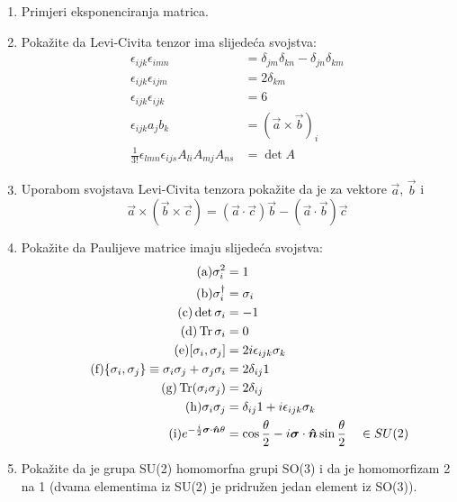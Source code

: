 \begin{enumerate}[{5}.1]

\item Primjeri eksponenciranja matrica.

\item \label{zad:LeviCivitaProperties} Pokažite da Levi-Civita tenzor ima slijedeća svojstva:
\begin{align*}
\tag{a}\epsilon_{ijk}\epsilon_{imn}&=\delta_{jm}\delta_{kn}-\delta_{jn}\delta_{km}\\
\tag{b}\epsilon_{ijk}\epsilon_{ijm}&=2\delta_{km} \\
\tag{c}\epsilon_{ijk}\epsilon_{ijk}&=6 \\
\tag{d}\epsilon_{ijk}a_j b_k &= (\vec{a}\times\vec{b})_i  \\
\tag{e}\frac{1}{3!}\epsilon_{lmn} \epsilon_{ijs} A_{li} A_{mj} A_{ns} &= \det A
\end{align*}

\item Uporabom svojstava Levi-Civita tenzora pokažite da je
za vektore $\vec{a}$, $\vec{b}$ i 
\begin{displaymath}
    \vec{a}\times(\vec{b}\times\vec{c})=(\vec{a}\cdot\vec{c})\vec{b}
 -(\vec{a}\cdot\vec{b})\vec{c}
\end{displaymath}

\item Pokažite da Paulijeve matrice imaju slijedeća svojstva:
\begin{align*}
\tag{a} \sigma_{i}^2 &= 1 \\
\tag{b} \sigma_{i}^\dagger &= \sigma_i \\
\tag{c} \det \sigma_i &= -1 \\
\tag{d} \Tr \sigma_i &=0 \\
\tag{e} [\sigma_i, \sigma_j] &= 2 i \epsilon_{ijk} \sigma_k \\
\tag{f} \{\sigma_i, \sigma_j\}\equiv \sigma_i\sigma_j + \sigma_j \sigma_i &= 2
\delta_{ij} 1 \\
\tag{g} \Tr (\sigma_i \sigma_j) &= 2\delta_{ij} \\
\tag{h} \sigma_i \sigma_j &= \delta_{ij} 1 + i \epsilon_{ijk}\sigma_k\\
\tag{i} e^{-\frac{i}{2}\vec{\sigma}\cdot\unitn \theta} &=
\cos \frac{\theta}{2}-i\vec{\sigma}\cdot\unitn \sin\frac{\theta}{2} \quad\in SU(2)
\end{align*}

\item Pokažite da je grupa SU(2) homomorfna grupi SO(3) i da je homomorfizam
       2 na 1 (dvama elementima iz SU(2) je pridružen jedan element iz SO(3)).


\end{enumerate}
